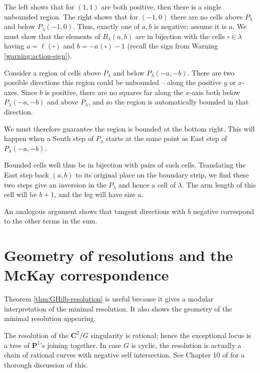 \documentclass{amsart}[12pt]
\theoremstyle{definition}
\newcommand{\C}{\mathbf{C}}
\newcommand{\proj}{\mathbf{P}}
\begin{document}
The left shows that for $(1,1)$ are both positive, then there is a single unbounded region.  The right shows that for $(-1,0)$ there are no cells above $P_\lambda$ and below $P_\lambda(-1,0)$.
Thus, exactly one of $a,b$ is negative; assume it is $a$.  We must show that the elements of $B_\lambda(a,b)$ are in bijection with the cells $\square\in\lambda$ having  $a=\ell(\square)$ and $b=-a(\square)-1$ (recall the sign from Warning \ref{warning:action-sign}).

Consider a region of cells above $P_\lambda$ and below $P_\lambda(-a,-b)$.  There are two possible directions this region could be unbounded -- along the positive $y$ or $x$-axes.  Since $b$ is positive, there are no squares far along the $x$-axis both below $P_\lambda(-a,-b)$  and above $P_\lambda$, and so the region is automatically bounded in that direction.  

We must therefore guarantee the region is bounded at the bottom right.  This will happen when a South step of $P_\lambda$ starts at the same point as East step of $P_\lambda(-a,-b)$.  




Bounded cells well thus be in bijection with pairs of such cells.  Translating the East step back $(a,b)$ to its original place on the boundary strip, we find these two steps give an inversion in the $P_\lambda$ and hence a cell of $\lambda$.  The arm length of this cell will be $b+1$, and the leg will have size $a$. 

An analogous argument shows that tangent directions with $b$ negative correspond to the other terms in the sum.

\section{Geometry of resolutions and the McKay correspondence}


Theorem \ref{thm:GHilb-resolution} is useful because it gives a modular interpretation of the minimal resolution.  It also shows the geometry of the minimal resolution appearing.

The resolution of the $\C^2/G$ singularity is rational; hence the exceptional locus is a tree of $\proj^1$'s joining together.  In case $G$ is cyclic, the resolution is actually a chain of rational curves with negative self intersection.  See Chapter 10 of \cite{toric} for a thorough discussion of this.

\begin{center}
\end{center}
\end{document}
